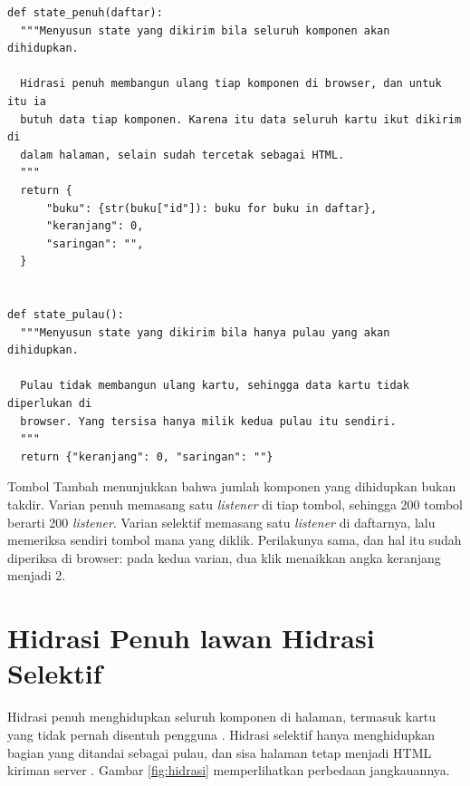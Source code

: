 \begin{lstlisting}[style=PythonStyle, caption={State yang dikirim kedua varian, tersedia di \berkas{sources/chapter11/komponen.py}}, label={lst:state11}]
def state_penuh(daftar):
  """Menyusun state yang dikirim bila seluruh komponen akan dihidupkan.

  Hidrasi penuh membangun ulang tiap komponen di browser, dan untuk itu ia
  butuh data tiap komponen. Karena itu data seluruh kartu ikut dikirim di
  dalam halaman, selain sudah tercetak sebagai HTML.
  """
  return {
      "buku": {str(buku["id"]): buku for buku in daftar},
      "keranjang": 0,
      "saringan": "",
  }


def state_pulau():
  """Menyusun state yang dikirim bila hanya pulau yang akan dihidupkan.

  Pulau tidak membangun ulang kartu, sehingga data kartu tidak diperlukan di
  browser. Yang tersisa hanya milik kedua pulau itu sendiri.
  """
  return {"keranjang": 0, "saringan": ""}
\end{lstlisting}

Tombol Tambah menunjukkan bahwa jumlah komponen yang dihidupkan bukan takdir.
Varian penuh memasang satu \textit{listener} di tiap tombol, sehingga 200
tombol berarti 200 \textit{listener}. Varian selektif memasang satu
\textit{listener} di daftarnya, lalu memeriksa sendiri tombol mana yang
diklik. Perilakunya sama, dan hal itu sudah diperiksa di browser: pada kedua
varian, dua klik menaikkan angka keranjang menjadi 2.

\section{Hidrasi Penuh lawan Hidrasi Selektif}

Hidrasi penuh menghidupkan seluruh komponen di halaman, termasuk kartu yang
tidak pernah disentuh pengguna \cite{react-hydrateroot}. Hidrasi selektif
hanya menghidupkan bagian yang ditandai sebagai pulau, dan sisa halaman tetap
menjadi HTML kiriman server \cite{astro-islands}. Gambar \ref{fig:hidrasi}
memperlihatkan perbedaan jangkauannya.

